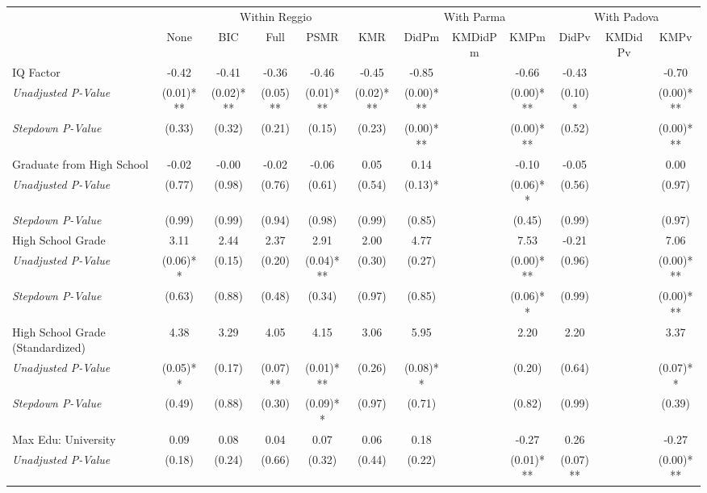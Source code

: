 \begin{tabular}{l c c c c c c c c c c c}
\toprule
& \multicolumn{5}{c}{Within Reggio} & \multicolumn{3}{c}{With Parma} & \multicolumn{3}{c}{With Padova} \\\cmidrule(lr){2-6} \cmidrule(lr){7-9} \cmidrule(lr){10-12}
 & None & BIC & Full & PSMR & KMR & DidPm & KMDidPm & KMPm & DidPv & KMDidPv & KMPv \\
\midrule
IQ Factor & -0.42 & -0.41 & -0.36 & -0.46 & -0.45 & -0.85 & & -0.66 & -0.43 & & -0.70 \\
\quad \textit{Unadjusted P-Value} & (0.01)*** & (0.02)*** & (0.05)** & (0.01)*** & (0.02)*** & (0.00)*** & & (0.00)*** & (0.10)* & & (0.00)*** \\
\quad \textit{Stepdown P-Value} & (0.33) & (0.32) & (0.21) & (0.15) & (0.23) & (0.00)*** & & (0.00)*** & (0.52) & & (0.00)*** \\
Graduate from High School & -0.02 & -0.00 & -0.02 & -0.06 & 0.05 & 0.14 & & -0.10 & -0.05 & & 0.00 \\
\quad \textit{Unadjusted P-Value} & (0.77) & (0.98) & (0.76) & (0.61) & (0.54) & (0.13)* & & (0.06)** & (0.56) & & (0.97) \\
\quad \textit{Stepdown P-Value} & (0.99) & (0.99) & (0.94) & (0.98) & (0.99) & (0.85) & & (0.45) & (0.99) & & (0.97) \\
High School Grade & 3.11 & 2.44 & 2.37 & 2.91 & 2.00 & 4.77 & & 7.53 & -0.21 & & 7.06 \\
\quad \textit{Unadjusted P-Value} & (0.06)** & (0.15) & (0.20) & (0.04)*** & (0.30) & (0.27) & & (0.00)*** & (0.96) & & (0.00)*** \\
\quad \textit{Stepdown P-Value} & (0.63) & (0.88) & (0.48) & (0.34) & (0.97) & (0.85) & & (0.06)** & (0.99) & & (0.00)*** \\
High School Grade (Standardized) & 4.38 & 3.29 & 4.05 & 4.15 & 3.06 & 5.95 & & 2.20 & 2.20 & & 3.37 \\
\quad \textit{Unadjusted P-Value} & (0.05)** & (0.17) & (0.07)** & (0.01)*** & (0.26) & (0.08)** & & (0.20) & (0.64) & & (0.07)** \\
\quad \textit{Stepdown P-Value} & (0.49) & (0.88) & (0.30) & (0.09)** & (0.97) & (0.71) & & (0.82) & (0.99) & & (0.39) \\
Max Edu: University & 0.09 & 0.08 & 0.04 & 0.07 & 0.06 & 0.18 & & -0.27 & 0.26 & & -0.27 \\
\quad \textit{Unadjusted P-Value} & (0.18) & (0.24) & (0.66) & (0.32) & (0.44) & (0.22) & & (0.01)*** & (0.07)** & & (0.00)*** \\

\end{tabular}
